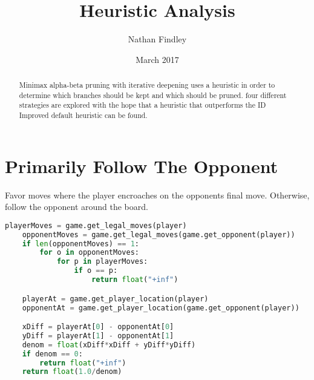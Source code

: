 \documentclass[10pt, a4paper]{article}
\title{Heuristic Analysis}
\author{Nathan Findley}
\date{March 2017}
\begin{document}
\maketitle
\tableofcontents

\begin{abstract}

Minimax alpha-beta pruning with iterative deepening uses a heuristic in
order to determine which branches should be kept and which should be pruned.
four different strategies are explored with the hope that a heuristic that outperforms
the ID Improved default heuristic can be found.

\end{abstract}

\section{Primarily Follow The Opponent}

Favor moves where the player encroaches on the opponents final move. Otherwise,
follow the opponent around the board.

\begin{lstlisting}[language=Python]
    playerMoves = game.get_legal_moves(player)
    opponentMoves = game.get_legal_moves(game.get_opponent(player))
    if len(opponentMoves) == 1:
        for o in opponentMoves:
            for p in playerMoves:
                if o == p:
                    return float("+inf")

    playerAt = game.get_player_location(player)
    opponentAt = game.get_player_location(game.get_opponent(player))

    xDiff = playerAt[0] - opponentAt[0]
    yDiff = playerAt[1] - opponentAt[1]
    denom = float(xDiff*xDiff + yDiff*yDiff)
    if denom == 0:
        return float("+inf")
    return float(1.0/denom)
\end{lstlisting}
\end{document}
